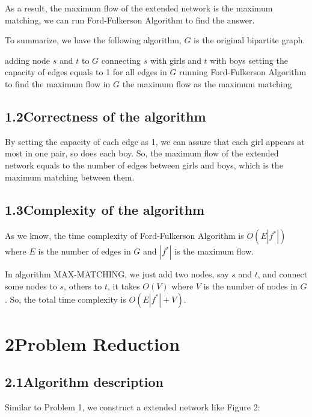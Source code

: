 \documentclass[a4paper,12pt]{article}
\begin{document}
As a result, the maximum flow of the extended network is the maximum matching, we can run Ford-Fulkerson Algorithm to find the answer.

To summarize, we have the following algorithm, $G$ is the original bipartite graph.
\begin{codebox}
\li adding node $s$ and $t$ to $G$
\li connecting $s$ with girls and $t$ with boys
\li setting the capacity of edges equals to 1 for all edges in $G$
\li running Ford-Fulkerson Algorithm to find the maximum flow in $G$
\li \Return the maximum flow as the maximum matching
\end{codebox}

\subsection*{\textnormal{1.2\quad Correctness of the algorithm}}

By setting the capacity of each edge as 1, we can assure that each girl appears at most in one pair, so does each boy. So, the maximum flow of the extended network equals to the number of edges between girls and boys, which is the maximum matching between them.

\subsection*{\textnormal{1.3\quad Complexity of the algorithm}}

As we know, the time complexity of Ford-Fulkerson Algorithm is $O(E|f^*|)$ where $E$ is the number of edges in $G$ and $|f^*|$ is the maximum flow.

In algorithm MAX-MATCHING, we just add two nodes, say $s$ and $t$, and connect some nodes to $s$, others to $t$, it takes $O(V)$ where $V$ is the number of nodes in $G$. So, the total time complexity is $O(E|f^*|+V)$.

\section*{2\quad Problem Reduction}
\subsection*{\textnormal{2.1\quad Algorithm description}}


Similar to Problem 1, we construct a extended network like Figure 2:
\end{document}
